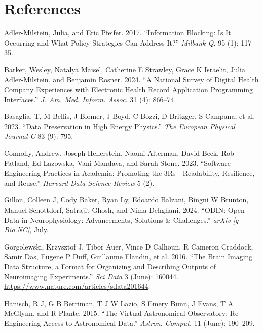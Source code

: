 \documentclass[
  letterpaper,
  DIV=11,
  numbers=noendperiod]{scrartcl}
\newlength{\cslhangindent}
\newenvironment{CSLReferences}[2] %
 {\begin{list}{}{%
  \setlength{\itemindent}{0pt}
  \setlength{\leftmargin}{0pt}
  \setlength{\parsep}{0pt}
  \ifodd #1
   \setlength{\leftmargin}{\cslhangindent}
   \setlength{\itemindent}{-1\cslhangindent}
  \fi
  \setlength{\itemsep}{#2\baselineskip}}}
 {\end{list}}
\begin{document}
\section*{References}\label{references}

\label{refs}
\begin{CSLReferences}{1}{0}
Adler-Milstein, Julia, and Eric Pfeifer. 2017. {``Information Blocking:
Is It Occurring and What Policy Strategies Can Address It?''}
\emph{Milbank Q.} 95 (1): 117--35.

Barker, Wesley, Natalya Maisel, Catherine E Strawley, Grace K Israelit,
Julia Adler-Milstein, and Benjamin Rosner. 2024. {``A National Survey of
Digital Health Company Experiences with Electronic Health Record
Application Programming Interfaces.''} \emph{J. Am. Med. Inform. Assoc.}
31 (4): 866--74.

Basaglia, T, M Bellis, J Blomer, J Boyd, C Bozzi, D Britzger, S Campana,
et al. 2023. {``Data Preservation in High Energy Physics.''} \emph{The
European Physical Journal C} 83 (9): 795.

Connolly, Andrew, Joseph Hellerstein, Naomi Alterman, David Beck, Rob
Fatland, Ed Lazowska, Vani Mandava, and Sarah Stone. 2023. {``{Software}
{Engineering} {Practices} in {Academia}: Promoting the
3Rs---{Readability}, {Resilience}, and {Reuse}.''} \emph{Harvard Data
Science Review} 5 (2).

Gillon, Colleen J, Cody Baker, Ryan Ly, Edoardo Balzani, Bingni W
Brunton, Manuel Schottdorf, Satrajit Ghosh, and Nima Dehghani. 2024.
{``{ODIN}: Open Data in Neurophysiology: Advancements, Solutions \&
Challenges.''} \emph{arXiv {[}q-Bio.NC{]}}, July.

Gorgolewski, Krzysztof J, Tibor Auer, Vince D Calhoun, R Cameron
Craddock, Samir Das, Eugene P Duff, Guillaume Flandin, et al. 2016.
{``The {Brain} {Imaging} {Data} {Structure}, a Format for Organizing and
Describing Outputs of Neuroimaging Experiments.''} \emph{Sci Data} 3
(June): 160044. \url{https://www.nature.com/articles/sdata201644}.

Hanisch, R J, G B Berriman, T J W Lazio, S Emery Bunn, J Evans, T A
McGlynn, and R Plante. 2015. {``The Virtual Astronomical Observatory:
Re-Engineering Access to Astronomical Data.''} \emph{Astron. Comput.} 11
(June): 190--209.


\end{CSLReferences}
\end{document}
